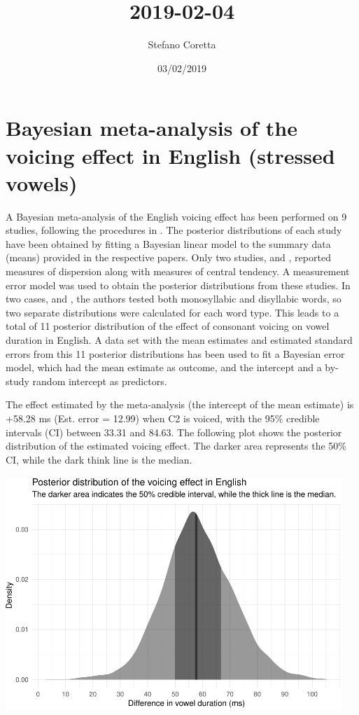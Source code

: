\documentclass[12pt,]{article}
\title{2019-02-04}
\author{Stefano Coretta}
\date{03/02/2019}
\begin{document}
\maketitle

\hypertarget{bayesian-meta-analysis-of-the-voicing-effect-in-english-stressed-vowels}{%
\section{Bayesian meta-analysis of the voicing effect in English
(stressed
vowels)}\label{bayesian-meta-analysis-of-the-voicing-effect-in-english-stressed-vowels}}

A Bayesian meta-analysis of the English voicing effect has been
performed on 9 studies, following the procedures in
\citet{nicenboim2018a}. The posterior distributions of each study have
been obtained by fitting a Bayesian linear model to the summary data
(means) provided in the respective papers. Only two studies,
\citet{davis1989} and \citet{ko2018}, reported measures of dispersion
along with measures of central tendency. A measurement error model was
used to obtain the posterior distributions from these studies. In two
cases, \citet{sharf1962} and \citet{klatt1973}, the authors tested both
monosyllabic and disyllabic words, so two separate distributions were
calculated for each word type. This leads to a total of 11 posterior
distribution of the effect of consonant voicing on vowel duration in
English. A data set with the mean estimates and estimated standard
errors from this 11 posterior distributions has been used to fit a
Bayesian error model, which had the mean estimate as outcome, and the
intercept and a by-study random intercept as predictors.

The effect estimated by the meta-analysis (the intercept of the mean
estimate) is +58.28 ms (Est. error = 12.99) when C2 is voiced, with the
95\% credible intervals (CI) between 33.31 and 84.63. The following plot
shows the posterior distribution of the estimated voicing effect. The
darker area represents the 50\% CI, while the dark think line is the
median.

\begin{center}\includegraphics[width=5in,height=3.5in]{2019-02-04_files/figure-latex/ve-est-post-1} \end{center}
\end{document}
